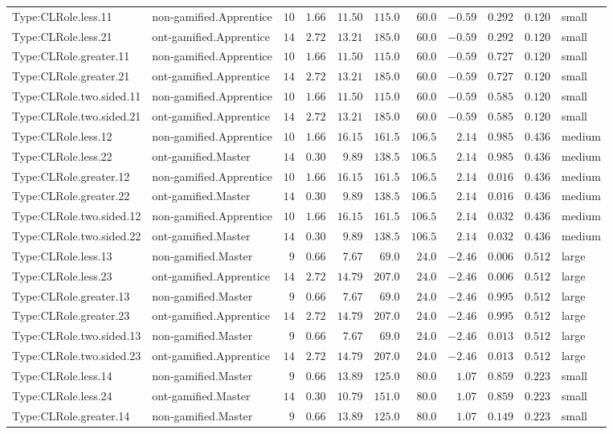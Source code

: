 \documentclass[6pt,a4paper]{article}
\begin{document}
{\begin{longtable}{llrrrrrrrrl}
Type:CLRole.less.11&non-gamified.Apprentice&$10$&$1.66$&$11.50$&$115.0$&$ 60.0$&$-0.59$&$0.292$&$0.120$&small\tabularnewline
Type:CLRole.less.21&ont-gamified.Apprentice&$14$&$2.72$&$13.21$&$185.0$&$ 60.0$&$-0.59$&$0.292$&$0.120$&small\tabularnewline
Type:CLRole.greater.11&non-gamified.Apprentice&$10$&$1.66$&$11.50$&$115.0$&$ 60.0$&$-0.59$&$0.727$&$0.120$&small\tabularnewline
Type:CLRole.greater.21&ont-gamified.Apprentice&$14$&$2.72$&$13.21$&$185.0$&$ 60.0$&$-0.59$&$0.727$&$0.120$&small\tabularnewline
Type:CLRole.two.sided.11&non-gamified.Apprentice&$10$&$1.66$&$11.50$&$115.0$&$ 60.0$&$-0.59$&$0.585$&$0.120$&small\tabularnewline
Type:CLRole.two.sided.21&ont-gamified.Apprentice&$14$&$2.72$&$13.21$&$185.0$&$ 60.0$&$-0.59$&$0.585$&$0.120$&small\tabularnewline
Type:CLRole.less.12&non-gamified.Apprentice&$10$&$1.66$&$16.15$&$161.5$&$106.5$&$ 2.14$&$0.985$&$0.436$&medium\tabularnewline
Type:CLRole.less.22&ont-gamified.Master&$14$&$0.30$&$ 9.89$&$138.5$&$106.5$&$ 2.14$&$0.985$&$0.436$&medium\tabularnewline
Type:CLRole.greater.12&non-gamified.Apprentice&$10$&$1.66$&$16.15$&$161.5$&$106.5$&$ 2.14$&$0.016$&$0.436$&medium\tabularnewline
Type:CLRole.greater.22&ont-gamified.Master&$14$&$0.30$&$ 9.89$&$138.5$&$106.5$&$ 2.14$&$0.016$&$0.436$&medium\tabularnewline
Type:CLRole.two.sided.12&non-gamified.Apprentice&$10$&$1.66$&$16.15$&$161.5$&$106.5$&$ 2.14$&$0.032$&$0.436$&medium\tabularnewline
Type:CLRole.two.sided.22&ont-gamified.Master&$14$&$0.30$&$ 9.89$&$138.5$&$106.5$&$ 2.14$&$0.032$&$0.436$&medium\tabularnewline
Type:CLRole.less.13&non-gamified.Master&$ 9$&$0.66$&$ 7.67$&$ 69.0$&$ 24.0$&$-2.46$&$0.006$&$0.512$&large\tabularnewline
Type:CLRole.less.23&ont-gamified.Apprentice&$14$&$2.72$&$14.79$&$207.0$&$ 24.0$&$-2.46$&$0.006$&$0.512$&large\tabularnewline
Type:CLRole.greater.13&non-gamified.Master&$ 9$&$0.66$&$ 7.67$&$ 69.0$&$ 24.0$&$-2.46$&$0.995$&$0.512$&large\tabularnewline
Type:CLRole.greater.23&ont-gamified.Apprentice&$14$&$2.72$&$14.79$&$207.0$&$ 24.0$&$-2.46$&$0.995$&$0.512$&large\tabularnewline
Type:CLRole.two.sided.13&non-gamified.Master&$ 9$&$0.66$&$ 7.67$&$ 69.0$&$ 24.0$&$-2.46$&$0.013$&$0.512$&large\tabularnewline
Type:CLRole.two.sided.23&ont-gamified.Apprentice&$14$&$2.72$&$14.79$&$207.0$&$ 24.0$&$-2.46$&$0.013$&$0.512$&large\tabularnewline
Type:CLRole.less.14&non-gamified.Master&$ 9$&$0.66$&$13.89$&$125.0$&$ 80.0$&$ 1.07$&$0.859$&$0.223$&small\tabularnewline
Type:CLRole.less.24&ont-gamified.Master&$14$&$0.30$&$10.79$&$151.0$&$ 80.0$&$ 1.07$&$0.859$&$0.223$&small\tabularnewline
Type:CLRole.greater.14&non-gamified.Master&$ 9$&$0.66$&$13.89$&$125.0$&$ 80.0$&$ 1.07$&$0.149$&$0.223$&small\tabularnewline

\end{longtable}}
\end{document}
